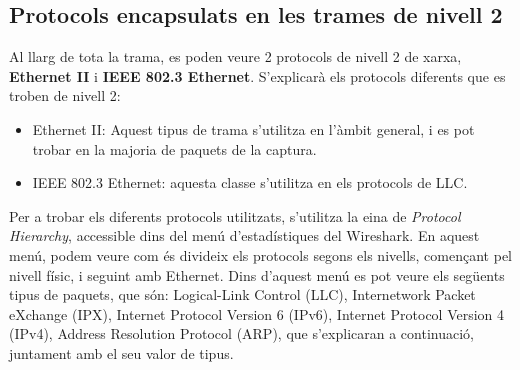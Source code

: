 \documentclass{article}
\begin{document}
\subsection{Protocols encapsulats en les trames de nivell 2}
Al llarg de tota la trama, es poden veure 2 protocols de nivell 2 de
xarxa, \textbf{Ethernet II} i \textbf{IEEE 802.3 Ethernet}. S'explicarà els 
protocols diferents que es troben de nivell 2:
\begin{itemize}
\item Ethernet II: Aquest tipus de trama s'utilitza en l'àmbit general, 
i es pot trobar en la majoria
de paquets de la captura.\\
\item IEEE 802.3 Ethernet: aquesta classe s'utilitza en els protocols de LLC.
\end{itemize}
Per a trobar els diferents protocols utilitzats, s'utilitza la eina de
\textit{Protocol Hierarchy}, accessible dins del menú d'estadístiques del
Wireshark. En aquest menú, podem veure com és divideix els protocols segons els
nivells, començant pel nivell físic, i seguint amb Ethernet. Dins d'aquest menú
es pot veure els següents tipus de paquets, que són: Logical-Link Control (LLC),
Internetwork Packet eXchange (IPX), Internet Protocol Version 6 (IPv6),
Internet Protocol Version 4 (IPv4), Address Resolution Protocol (ARP), que
s'explicaran a continuació, juntament amb el seu valor de tipus.\\
\end{document}
